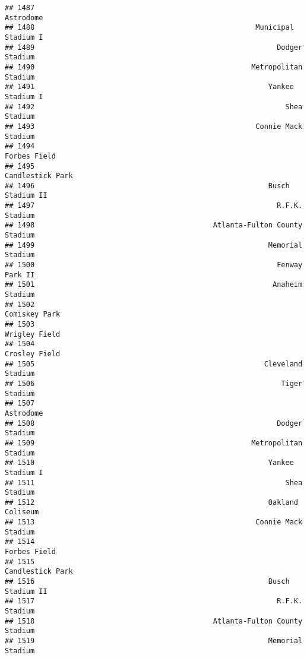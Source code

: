 \documentclass[]{article}
\begin{document}
\begin{verbatim}
## 1487                                                              Astrodome
## 1488                                                    Municipal Stadium I
## 1489                                                         Dodger Stadium
## 1490                                                   Metropolitan Stadium
## 1491                                                       Yankee Stadium I
## 1492                                                           Shea Stadium
## 1493                                                    Connie Mack Stadium
## 1494                                                           Forbes Field
## 1495                                                       Candlestick Park
## 1496                                                       Busch Stadium II
## 1497                                                         R.F.K. Stadium
## 1498                                          Atlanta-Fulton County Stadium
## 1499                                                       Memorial Stadium
## 1500                                                         Fenway Park II
## 1501                                                        Anaheim Stadium
## 1502                                                          Comiskey Park
## 1503                                                          Wrigley Field
## 1504                                                          Crosley Field
## 1505                                                      Cleveland Stadium
## 1506                                                          Tiger Stadium
## 1507                                                              Astrodome
## 1508                                                         Dodger Stadium
## 1509                                                   Metropolitan Stadium
## 1510                                                       Yankee Stadium I
## 1511                                                           Shea Stadium
## 1512                                                       Oakland Coliseum
## 1513                                                    Connie Mack Stadium
## 1514                                                           Forbes Field
## 1515                                                       Candlestick Park
## 1516                                                       Busch Stadium II
## 1517                                                         R.F.K. Stadium
## 1518                                          Atlanta-Fulton County Stadium
## 1519                                                       Memorial Stadium

\end{verbatim}
\end{document}

